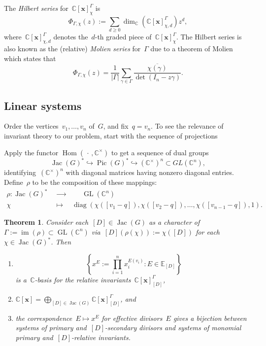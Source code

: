 \documentclass{amsart}
\newtheorem{thm}{Theorem}[section]
\DeclareMathOperator{\Pic}{Pic}
\DeclareMathOperator{\Jac}{Jac}
\DeclareMathOperator{\Div}{Div}
\DeclareMathOperator{\diag}{diag}
\DeclareMathOperator{\im}{im}
\DeclareMathOperator{\GL}{GL}
\DeclareMathOperator{\Hom}{Hom}
\newcommand{\Z}{\mathbb{Z}}
\newcommand{\C}{\mathbb{C}}
\newcommand{\E}{\mathbb{E}}
\newcommand{\polyring}{\C[\mathbf{x}]}
\begin{document}
The {\em Hilbert series} for~$\polyring^{\Gamma}_{\chi}$ is
\[
  \Phi_{\Gamma,\chi}(z):=\sum_{d\geq
  0}\dim_{\C}(\polyring_{\chi,d}^{\Gamma})z^d,
\]
where~$\polyring_{\chi,d}^{\Gamma}$ denotes the~$d$-th graded piece
of~$\polyring_{\chi}^{\Gamma}$.
The Hilbert series is also known as the (relative) {\em Molien series} for~$\Gamma$ due to a
theorem of Molien which states that
\begin{equation} \label{eqn: Molien}
  \Phi_{\Gamma,\chi}(z) =
  \frac{1}{|\Gamma|}\sum_{\gamma\in\Gamma}\frac{\overline{\chi(\gamma)}}{\det(I_n-z\gamma)}.
\end{equation}

\subsection{Linear systems}\label{subsection: linear systems} Order the vertices~$v_1,\dots,v_n$ of~$G$, and
fix~$q=v_n$. To see the relevance of invariant theory to our problem, start
with the sequence of projections
\begin{center}
\end{center}
Apply the functor $\Hom(\,\cdot\,,\C^{\times})$ to get a sequence of dual groups
\[
  \Jac(G)^*\hookrightarrow\Pic(G)^*\hookrightarrow(\C^\times)^n\subset GL(\C^n),
\]
identifying~$(\C^{\times})^n$ with diagonal matrices having nonzero diagonal
entries.  Define~$\rho$ to be the composition of these mappings:
\begin{align}\label{rho}
  \rho\colon\Jac(G)^{*}\ &\xrightarrow{\qquad}\qquad\GL(\C^n)\\
  \nonumber
  \chi\qquad
  &\mapsto\quad\diag(\chi([v_1-q]),\chi([v_2-q]),\dots,\chi([v_{n-1}-q]),1).
\end{align}
\begin{thm}\label{thm: invariants}
  Consider each~$[D]\in\Jac(G)$ as a character of~$\Gamma:=\im(\rho)\subset\GL(\C^n)$
  via~$[D](\rho(\chi)):=\chi([D])$ for each~$\chi\in\Jac(G)^{*}$.  Then 
  \begin{enumerate}[label=\rm{(\arabic*)},leftmargin=*]
    \item\label{inv1} 
\[
  \textstyle \left\{x^{E}:=\prod_{i=1}^nx_i^{E(v_i)}: E\in\E_{[D]} \right\}
\]
is a~$\C$-basis for the relative invariants~$\polyring^{\Gamma}_{[D]}$,
\item\label{inv2} $\polyring=\bigoplus_{[D]\in\Jac(G)}\polyring^{\Gamma}_{[D]}$, and
\item\label{inv3}  the correspondence~$E\mapsto x^{E}$ for effective divisors~$E$ gives a
  bijection between systems of primary and~$[D]$-secondary divisors and systems
  of monomial primary and~$[D]$-relative invariants.
  \end{enumerate}
\end{thm}
\end{document}
